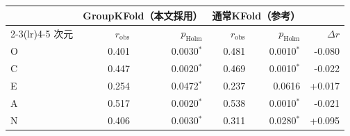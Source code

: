 \begin{tabular}{lrrrrr}
\toprule
 & \multicolumn{2}{c}{GroupKFold（本文採用）} & \multicolumn{2}{c}{通常KFold（参考）} & \\
\cmidrule(lr){2-3}\cmidrule(lr){4-5}
次元 & $r_{\mathrm{obs}}$ & $p_{\mathrm{Holm}}$ & $r_{\mathrm{obs}}$ & $p_{\mathrm{Holm}}$ & $\Delta r$ \\
\midrule
O & 0.401 & 0.0030$^{*}$ & 0.481 & 0.0010$^{*}$ & -0.080 \\
C & 0.447 & 0.0020$^{*}$ & 0.469 & 0.0010$^{*}$ & -0.022 \\
E & 0.254 & 0.0472$^{*}$ & 0.237 & 0.0616 & +0.017 \\
A & 0.517 & 0.0020$^{*}$ & 0.538 & 0.0010$^{*}$ & -0.021 \\
N & 0.406 & 0.0030$^{*}$ & 0.311 & 0.0280$^{*}$ & +0.095 \\
\bottomrule
\end{tabular}
